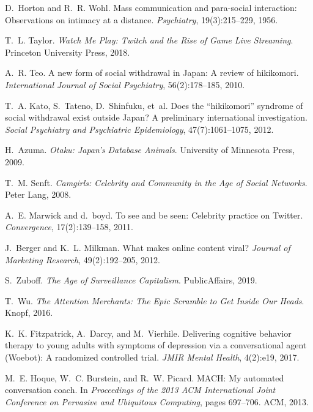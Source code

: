 \documentclass[12pt]{article}
\begin{document}
\begin{thebibliography}{99}

D.~Horton and R.~R. Wohl.
\newblock Mass communication and para-social interaction: Observations on intimacy at a distance.
\newblock \emph{Psychiatry}, 19(3):215--229, 1956.

T.~L. Taylor.
\newblock \emph{Watch Me Play: Twitch and the Rise of Game Live Streaming}.
\newblock Princeton University Press, 2018.

A.~R. Teo.
\newblock A new form of social withdrawal in Japan: A review of hikikomori.
\newblock \emph{International Journal of Social Psychiatry}, 56(2):178--185, 2010.

T.~A. Kato, S.~Tateno, D.~Shinfuku, et~al.
\newblock Does the ``hikikomori'' syndrome of social withdrawal exist outside Japan? A preliminary international investigation.
\newblock \emph{Social Psychiatry and Psychiatric Epidemiology}, 47(7):1061--1075, 2012.

H.~Azuma.
\newblock \emph{Otaku: Japan's Database Animals}.
\newblock University of Minnesota Press, 2009.

T.~M. Senft.
\newblock \emph{Camgirls: Celebrity and Community in the Age of Social Networks}.
\newblock Peter Lang, 2008.

A.~E. Marwick and d.~boyd.
\newblock To see and be seen: Celebrity practice on {Twitter}.
\newblock \emph{Convergence}, 17(2):139--158, 2011.

J.~Berger and K.~L. Milkman.
\newblock What makes online content viral?
\newblock \emph{Journal of Marketing Research}, 49(2):192--205, 2012.

S.~Zuboff.
\newblock \emph{The Age of Surveillance Capitalism}.
\newblock PublicAffairs, 2019.

T.~Wu.
\newblock \emph{The Attention Merchants: The Epic Scramble to Get Inside Our Heads}.
\newblock Knopf, 2016.

K.~K. Fitzpatrick, A.~Darcy, and M.~Vierhile.
\newblock Delivering cognitive behavior therapy to young adults with symptoms of depression via a conversational agent (Woebot): A randomized controlled trial.
\newblock \emph{JMIR Mental Health}, 4(2):e19, 2017.

M.~E. Hoque, W.~C. Burstein, and R.~W. Picard.
\newblock MACH: My automated conversation coach.
\newblock In \emph{Proceedings of the 2013 ACM International Joint Conference on Pervasive and Ubiquitous Computing}, pages 697--706. ACM, 2013.


\end{thebibliography}
\end{document}
